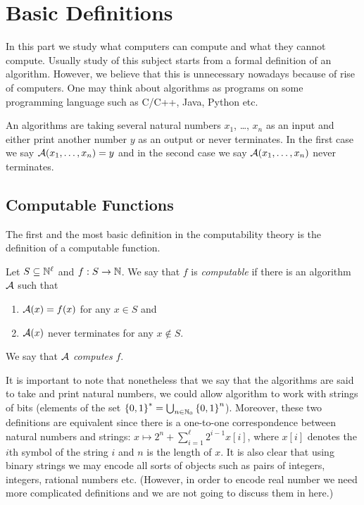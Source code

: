\chapter{Basic Definitions}
In this part we study what computers can compute and what they cannot compute.
Usually study of this subject starts from a formal definition of an algorithm.
However, we believe that this is unnecessary nowadays because of rise of
computers. One may think about algorithms as programs on some programming
language such as C/C++, Java, Python etc.

An algorithms are taking several natural numbers $x_1$, \dots, $x_n$
as an input and either print another number $y$ as an output or never
terminates. In the first case we say $\mathcal{A}(x_1, \dots, x_n) = y$
and in the second case we say $\mathcal{A}(x_1, \dots, x_n)$ never terminates.

\section{Computable Functions}
The first and the most basic definition in the computability theory is the
definition of a computable function.
\begin{definition}
    Let $S \subseteq \mathbb{N}^\ell$ and $f : S \to \mathbb{N}$.
    We say that $f$ is \emph{computable} if there is an algorithm
    $\mathcal{A}$ such that
    \begin{enumerate}
        \item $\mathcal{A}(x) = f(x)$ for any $x \in S$ and
        \item $\mathcal{A}(x)$ never terminates for any $x \notin S$.
    \end{enumerate}

    We say that $\mathcal{A}$ \emph{computes} $f$.
\end{definition}

It is important to note that nonetheless that we say that the algorithms are
said to take and print natural numbers, we could allow algorithm to work with
strings of bits (elements of the set
$\strings = \bigcup_{n \in \N_0} \set{0, 1}^n$).
Moreover, these two definitions are  equivalent since there is a one-to-one
correspondence between natural numbers and strings:
$x \mapsto 2^n + \sum_{i = 1}^\ell 2^{i - 1} x[i]$, where $x[i]$ denotes the
$i$th symbol of the string $i$ and $n$ is the length of $x$.
It is also clear that using binary strings we may encode all sorts of objects
such as pairs of integers, integers, rational numbers etc. (However, in order
to encode real number we need more complicated definitions and we are not
going to discuss them in here.)


